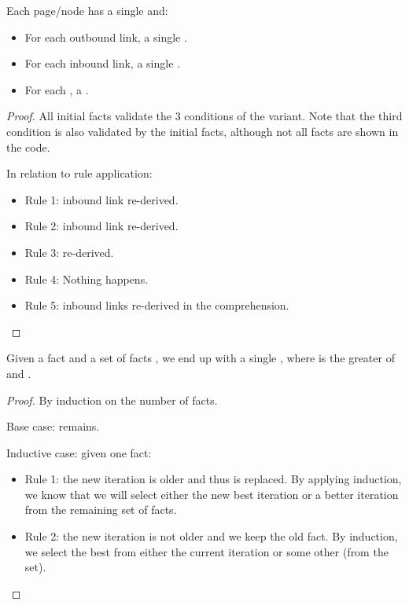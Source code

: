 \begin{invariant}
Each page/node has a single  and:
\begin{itemize}
   \item For each outbound link, a single .
   \item For each inbound link, a single .
   \item For each , a
      .
\end{itemize}
\end{invariant}

\begin{proof}

All initial facts validate the 3 conditions of the variant. Note that the third
condition is also validated by the initial facts, although not all facts are shown in
the code.

In relation to rule application:

\begin{itemize}
   \item Rule 1: inbound link re-derived.
   \item Rule 2: inbound link re-derived.
   \item Rule 3:  re-derived.
   \item Rule 4: Nothing happens.
   \item Rule 5: inbound links re-derived in the comprehension.
\end{itemize}
\end{proof}

\begin{lemma}

Given a fact  and a set of facts
, we end up with a single
, where  is the greater of
 and .

\end{lemma}
\begin{proof}
By induction on the number of  facts.

Base case:  remains.

Inductive case: given one  fact:

\begin{itemize}
   \item Rule 1: the new iteration is older and thus 
   is replaced. By applying induction, we know that we will select either the
   new best iteration or a better iteration from the remaining set of
    facts.
   \item Rule 2: the new iteration is not older and we keep the old
    fact. By induction, we select the best from either
   the current iteration or some other (from the set).
\end{itemize}
\end{proof}

